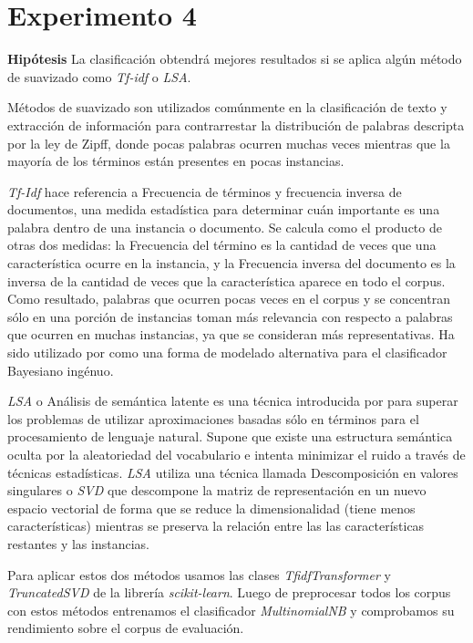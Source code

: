 \section{Experimento 4}
\vspace{3 mm}
\textbf{Hipótesis} La clasificación obtendrá mejores resultados si se aplica algún método de suavizado como \textit{Tf-idf} o \textit{LSA}.
\vspace{3 mm}

Métodos de suavizado son utilizados comúnmente en la clasificación de texto y extracción de información para contrarrestar la distribución de palabras descripta por la ley de Zipff, donde pocas palabras ocurren muchas veces mientras que la mayoría de los términos están presentes en pocas instancias.

\textit{Tf-Idf} hace referencia a Frecuencia de términos y frecuencia inversa de documentos, una medida estadística para determinar cuán importante es una palabra dentro de una instancia o documento. Se calcula como el producto de otras dos medidas: la Frecuencia del término es la cantidad de veces que una característica ocurre en la instancia, y la Frecuencia inversa del documento es la inversa de la cantidad de veces que la característica aparece en todo el corpus. Como resultado, palabras que ocurren pocas veces en el corpus y se concentran sólo en una porción de instancias toman más relevancia con respecto a palabras que ocurren en muchas instancias, ya que se consideran más representativas. Ha sido utilizado por \citet{tackling-mnb} como una forma de modelado alternativa para el clasificador Bayesiano ingénuo.

\textit{LSA} o Análisis de semántica latente es una técnica introducida por \citet{lsa} para superar los problemas de utilizar aproximaciones basadas sólo en términos para el procesamiento de lenguaje natural. Supone que existe una estructura semántica oculta por la aleatoriedad del vocabulario e intenta minimizar el ruido a través de técnicas estadísticas. \textit{LSA} utiliza una técnica llamada Descomposición en valores singulares o \textit{SVD} que descompone la matriz de representación en un nuevo espacio vectorial de forma que se reduce la dimensionalidad (tiene menos características) mientras se preserva la relación entre las las características restantes y las instancias.

Para aplicar estos dos métodos usamos las clases \textit{TfidfTransformer} y \textit{TruncatedSVD} de la librería \textit{scikit-learn}. Luego de preprocesar todos los corpus con estos métodos entrenamos el clasificador \textit{MultinomialNB} y comprobamos su rendimiento sobre el corpus de evaluación.


